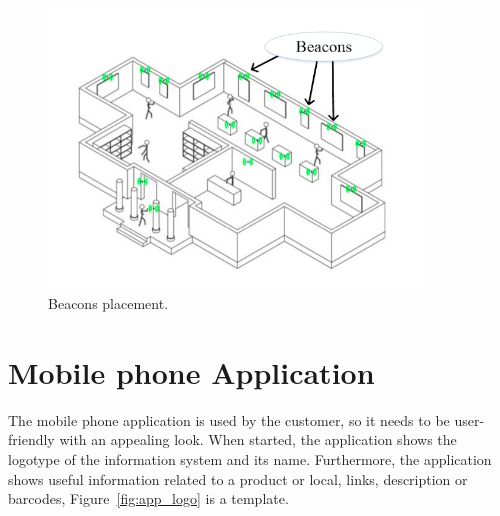 \begin{figure}[!htb]
	\centering
	\includegraphics[width=0.9\textwidth]{Figures/placementv2.png}
	\caption[Beacons placement]{Beacons placement.}
	\label{fig:placement}
\end{figure}




\section{Mobile phone Application}
\label{section:app}
The mobile phone application is used by the customer, so it needs to be
user-friendly with an appealing look. When started, the application shows the logotype of the information system and its name. Furthermore, the application shows useful information related to a product or local, links, description or barcodes, Figure~\ref{fig:app_logo} is a template.

